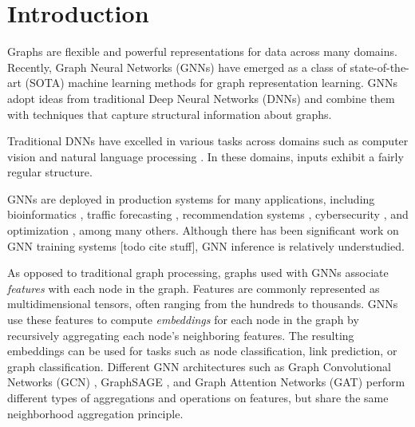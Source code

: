 \chapter{Introduction}


 
Graphs are flexible and powerful representations for data across many domains. Recently, Graph Neural Networks (GNNs) have emerged as a class of state-of-the-art (SOTA) machine learning methods for graph representation learning. GNNs adopt ideas from traditional Deep Neural Networks (DNNs) and combine them with techniques that capture structural information about graphs.

Traditional DNNs have excelled in various tasks across domains such as computer vision \cite{AlexNet_2012}\cite{YOLO_2016} and natural language processing \cite{RNN_2013}\cite{NamedEntityRecognition_2016}. In these domains, inputs exhibit a fairly regular structure.

GNNs are deployed in production systems for many applications, including bioinformatics \cite{Bioinfo_2021} \cite{Bioinfo_2022}, 
traffic forecasting \cite{Traffic_SST-GNN_2021} \cite{Traffic_GoogleMaps_2021} \cite{Traffic_survey_2021}, recommendation systems \cite{Recsys_PinSAGE_2018} \cite{Recsys_Diffnet_2022}\cite{Recsys_LightGCN_2020}\cite{Recsys_NAGCN_2020}\cite{Recsys_SGL_2021}\cite{Recsys_Survey_2022}, 
cybersecurity \cite{Cybersec_2022} \cite{Cybersec_2023}, and optimization \cite{CombinatorialOptimization_2019}\cite{CombinatorialOptimization_2021}, among many others. Although there has been significant work on GNN training systems [todo cite stuff], GNN inference is relatively understudied. 

As opposed to traditional graph processing, graphs used with GNNs associate \textit{features} with each node in the graph. 
Features are commonly represented as multidimensional tensors, often ranging from the hundreds to thousands. GNNs use these features to compute \textit{embeddings} for each node in the graph by recursively aggregating each node's neighboring features. 
The resulting embeddings can be used for tasks such as node classification, link prediction, or graph classification.
Different GNN architectures such as Graph Convolutional Networks (GCN) \cite{GCN_2016}, GraphSAGE \cite{GraphSAGE_2017}, and Graph Attention Networks (GAT) \cite{GAT_2018} perform different types of aggregations and operations on features, but share the same neighborhood aggregation principle.





